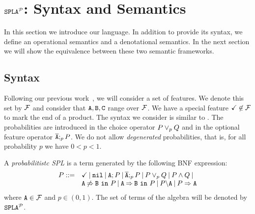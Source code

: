 \section{$\fodaPAp$: Syntax and Semantics}
\label{sec:stat:sintax}
In this section we introduce our language. In addition to provide its syntax, we define an operational semantics and a denotational semantics. In the next section we will show the equivalence between these two semantic frameworks.

\subsection{Syntax}
\label{sec:stat:sintax}
Following our previous work~\cite{acl13,cln16}, we will consider a
set of features. We denote this set by $\calF$ and consider that $\feature{A}, \feature{B},
\feature{C}$ range over $\calF$. We have a special feature
$\checkmark\not\in\calF$ to mark the end  of a product. The syntax we consider is similar to
\fodaPA. The probabilities are introduced in the choice operator $P \choice_{p} Q $ and in
the optional feature operator $\ofeature{A};_{p} P$. We do not allow
\emph{degenerated} probabilities, that is, for all probability $p$ we have $0< p<1$.

\bdfn
\label{sec:stat:sintax:dfn}
A \emph{probabilitistc SPL} is a term generated by the following
BNF expression:
$$
\begin{array}{ll}
P::=& \checkmark \barra \nil \barra \feature{A};P \barra
\ofeature{A};_{p} P \barra P \choice_{p} Q \barra P \paral Q \barra
\\
& \exclude{A}{B}{P}\barra  \require{A}{B}{P}\barra  \forbid{A}{P}\barra  \mandatory{A}{P}\\
\end{array}
$$
\noindent
where $\feature{A} \in \calF$ and $p\in(0,1)$. The set of terms of the
algebra will be denoted by  $\fodaPAp$.
\edfn


